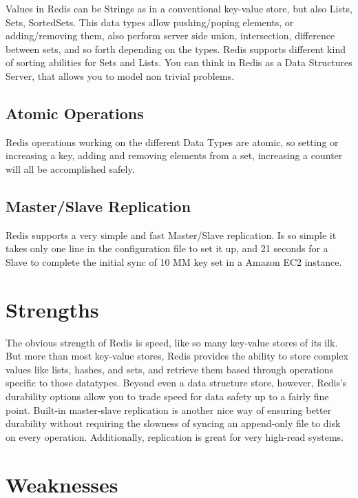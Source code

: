 Values in Redis can be Strings as in a conventional key-value store, but also Lists, Sets, SortedSets. This data types allow pushing/poping elements, or adding/removing them, also perform server side union, intersection, difference between sets, and so forth depending on the types. Redis supports different kind of sorting abilities for Sets and Lists. You can think in Redis as a Data Structures Server, that allows you to model non trivial problems.

\subsection{Atomic Operations}

Redis operations working on the different Data Types are atomic, so setting or increasing a key, adding and removing elements from a set, increasing a counter will all be accomplished safely.

\subsection{Master/Slave Replication}

Redis supports a very simple and fast Master/Slave replication. Is so simple it takes only one line in the configuration file to set it up, and 21 seconds for a Slave to complete the initial sync of 10 MM key set in a Amazon EC2 instance.

\section{Strengths}

The obvious strength of Redis is speed, like so many key-value stores of its ilk. But more than most key-value stores, Redis provides the ability to store complex values like lists, hashes, and sets, and retrieve them based through operations specific to those datatypes. Beyond even a data structure store, however, Redis's durability options allow you to trade speed for data safety up to a fairly fine point. Built-in master-slave replication is another nice way of ensuring better durability without requiring the slowness of syncing an append-only file to disk on every operation. Additionally, replication is great for very high-read systems.\cite{seven_databases}

\section{Weaknesses}

